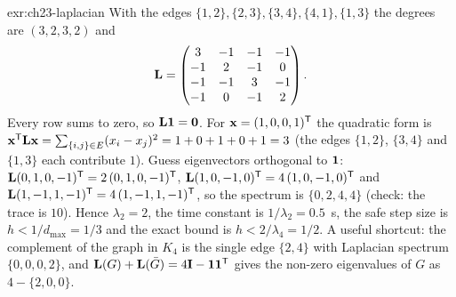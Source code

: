 \begin{solution}{exr:ch23-laplacian}
With the edges $\{1,2\},\{2,3\},\{3,4\},\{4,1\},\{1,3\}$ the degrees are $(3,2,3,2)$ and
\[
\mathbf{L}=\begin{pmatrix} 3&-1&-1&-1\\ -1&2&-1&0\\ -1&-1&3&-1\\ -1&0&-1&2\end{pmatrix}.
\]
Every row sums to zero, so $\mathbf{L}\mathbf{1}=\mathbf{0}$. For $\mathbf{x}=(1,0,0,1)^{\mathsf{T}}$ the quadratic form is $\mathbf{x}^{\mathsf{T}}\mathbf{L}\mathbf{x}=\sum_{\{i,j\}\in E}(x_i-x_j)^2=1+0+1+0+1=3$ (the edges $\{1,2\}$, $\{3,4\}$ and $\{1,3\}$ each contribute $1$). Guess eigenvectors orthogonal to $\mathbf{1}$: $\mathbf{L}(0,1,0,-1)^{\mathsf{T}}=2\,(0,1,0,-1)^{\mathsf{T}}$, $\mathbf{L}(1,0,-1,0)^{\mathsf{T}}=4\,(1,0,-1,0)^{\mathsf{T}}$ and $\mathbf{L}(1,-1,1,-1)^{\mathsf{T}}=4\,(1,-1,1,-1)^{\mathsf{T}}$, so the spectrum is $\{0,2,4,4\}$ (check: the trace is $10$). Hence $\lambda_2=2$, the time constant is $1/\lambda_2=0.5$~s, the safe step size is $h<1/d_{\max}=1/3$ and the exact bound is $h<2/\lambda_4=1/2$. A useful shortcut: the complement of the graph in $K_4$ is the single edge $\{2,4\}$ with Laplacian spectrum $\{0,0,0,2\}$, and $\mathbf{L}(G)+\mathbf{L}(\bar G)=4\mathbf{I}-\mathbf{1}\mathbf{1}^{\mathsf{T}}$ gives the non-zero eigenvalues of $G$ as $4-\{2,0,0\}$.
\end{solution}

